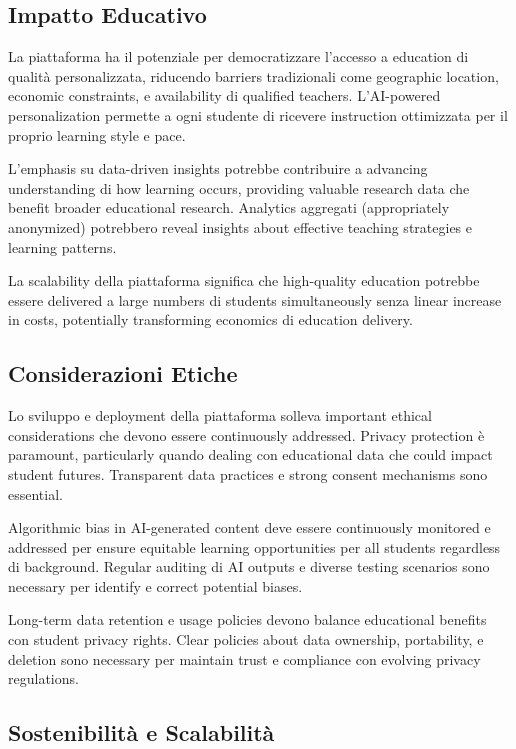 \documentclass[12pt,a4paper]{article}
\begin{document}
\subsection{Impatto Educativo}

La piattaforma ha il potenziale per democratizzare l'accesso a education di qualità personalizzata, riducendo barriers tradizionali come geographic location, economic constraints, e availability di qualified teachers. L'AI-powered personalization permette a ogni studente di ricevere instruction ottimizzata per il proprio learning style e pace.

L'emphasis su data-driven insights potrebbe contribuire a advancing understanding di how learning occurs, providing valuable research data che benefit broader educational research. Analytics aggregati (appropriately anonymized) potrebbero reveal insights about effective teaching strategies e learning patterns.

La scalability della piattaforma significa che high-quality education potrebbe essere delivered a large numbers di students simultaneously senza linear increase in costs, potentially transforming economics di education delivery.

\subsection{Considerazioni Etiche}

Lo sviluppo e deployment della piattaforma solleva important ethical considerations che devono essere continuously addressed. Privacy protection è paramount, particularly quando dealing con educational data che could impact student futures. Transparent data practices e strong consent mechanisms sono essential.

Algorithmic bias in AI-generated content deve essere continuously monitored e addressed per ensure equitable learning opportunities per all students regardless di background. Regular auditing di AI outputs e diverse testing scenarios sono necessary per identify e correct potential biases.

Long-term data retention e usage policies devono balance educational benefits con student privacy rights. Clear policies about data ownership, portability, e deletion sono necessary per maintain trust e compliance con evolving privacy regulations.

\subsection{Sostenibilità e Scalabilità}
\end{document}

